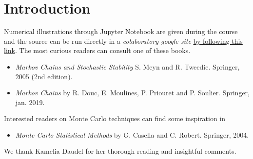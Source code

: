 \documentclass[english,graybox,envcountchap,envcountsame,sectrefs,shortlabels]{svmono}
\theoremstyle{style}
\begin{document}
\chapter*{Introduction}
Numerical illustrations through Jupyter Notebook are given during the course and the source can be run directly in a {\em colaboratory google site} \href{https://colab.research.google.com/drive/1Ey5TNx-_74gPH0FG-rhXSuGGok0T10wS\#}{by following this link}.
The most curious readers can consult one of these books.
\begin{itemize}
\item {\em Markov Chains and Stochastic Stability} S. Meyn and R. Tweedie. Springer, 2005 (2nd edition).
\item {\em Markov Chains} by R. Douc, E. Moulines, P. Priouret and P. Soulier. Springer, jan. 2019.
\end{itemize}
Interested readers on Monte Carlo techniques can find some inspiration in
\begin{itemize}
\item {\em Monte Carlo Statistical Methods} by G. Casella and C. Robert. Springer, 2004.
\end{itemize}
We thank Kamelia Daudel for her thorough reading and insightful comments.

\clearpage
\newpage
\end{document}
